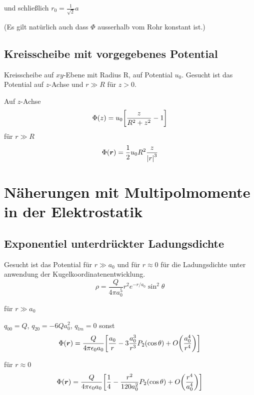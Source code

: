     und schließlich $r_0=\frac{1}{\sqrt{2}}a$
    
    (Es gilt natürlich auch dass $\Phi$ ausserhalb vom Rohr konstant ist.)

  \subsection{Kreisscheibe mit vorgegebenes Potential}
  Kreisscheibe auf $xy$-Ebene mit Radius R, auf Potential $u_0$. 
  Gesucht ist das Potential auf 
  $z$-Achse und $r\gg R$ für $z>0$. 
  
  Auf $z$-Achse
  \begin{equation}
    \Phi(z)=u_0\qty[\frac{z}{R^2+z^2}-1]
  \end{equation}
  für $r\gg R$
  \begin{equation}
    \Phi(\vb*r)=\frac{1}{2}u_0R^2 \frac{z}{\abs{r}^3}
  \end{equation}

  \section{Näherungen mit Multipolmomente in der Elektrostatik}
  \subsection{Exponentiel unterdrückter Ladungsdichte}
  Gesucht ist das Potential für $r\gg a_0$ und für $r\approx 0$ für die 
  Ladungsdichte unter anwendung der Kugelkoordinatenentwicklung.
  \begin{equation*}
    \rho=\frac{Q}{4\pi a_0^5}r^2 e^{-r/a_0}\sin^2\theta
  \end{equation*}

  für $r\gg a_0$

  $q_{00}=Q$, $q_{20}=-6Qa_0^2$, $q_{lm}=0$ sonst
  \begin{equation}
    \Phi(\vb*r)= \frac{Q}{4\pi\epsilon_0a_0}\qty[\frac{a_0}{r} -3 
    \frac{a_0^3}{r^3} P_2(\cos\theta) + O\qty(\frac{a_0^4}{r^4})]
  \end{equation}
  
  für $r\approx 0$
  \begin{equation}
    \Phi(\vb*r)= \frac{Q}{4\pi\epsilon_0a_0}
    \qty[\frac{1}{4} - 
    \frac{r^2}{120 a_0^2} P_2(\cos\theta)
    +O\qty(\frac{r^4}{a_0^4} )]
  \end{equation}


